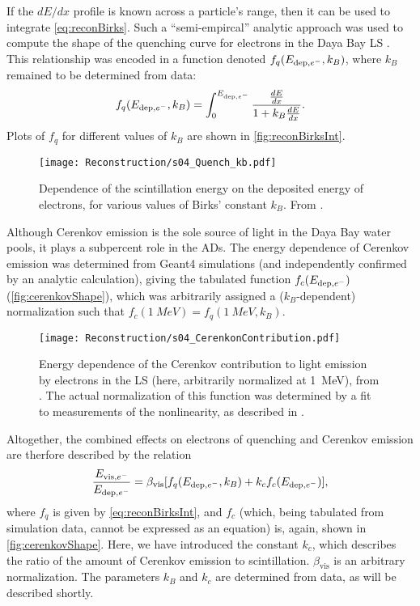 \documentclass[../thesis.tex]{subfiles}
\begin{document}
If the $dE/dx$ profile is known across a particle's range, then it can be used to integrate \eqref{eq:reconBirks}. Such a ``semi-empircal'' analytic approach was used to compute the shape of the quenching curve for electrons in the Daya Bay LS \cite{NonlinearityPaper}. This relationship was encoded in a function denoted $f_q(E_{\mathrm{dep},e^-}, k_B)$, where $k_B$ remained to be determined from data:
\begin{equation}
  f_q(E_{\mathrm{dep},e^-},k_B) = \int_0^{E_{\mathrm{dep},e^-}} \frac{\frac{dE}{dx}}{1 + k_B \frac{dE}{dx}}.
  \label{eq:reconBirksInt}
\end{equation}
Plots of $f_q$ for different values of $k_B$ are shown in \autoref{fig:reconBirksInt}.

\begin{figure}[h]
  \texttt{[image: Reconstruction/s04\_Quench\_kb.pdf]}
  \caption{Dependence of the scintillation energy on the deposited energy of electrons, for various values of Birks' constant $k_B$. From \cite{NonlinearityPaper}.}
  \label{fig:reconBirksInt}
\end{figure}

Although Cerenkov emission is the sole source of light in the Daya Bay water pools, it plays a subpercent role in the ADs. The energy dependence of Cerenkov emission was determined from Geant4 simulations (and independently confirmed by an analytic calculation), giving the tabulated function $f_c(E_{\mathrm{dep},e^-})$ (\autoref{fig:cerenkovShape}), which was arbitrarily assigned a ($k_B$-dependent) normalization such that $f_c(\SI{1}{MeV}) = f_q(\SI{1}{MeV}, k_B)$. 

\begin{figure}[h]
  \texttt{[image: Reconstruction/s04\_CerenkonContribution.pdf]}
  \caption{Energy dependence of the Cerenkov contribution to light emission by electrons in the LS (here, arbitrarily normalized at 1~MeV), from \cite{NonlinearityPaper}. The actual normalization of this function was determined by a fit to measurements of the nonlinearity, as described in \cite{NonlinearityPaper}.}
  \label{fig:cerenkovShape}
\end{figure}

Altogether, the combined effects on electrons of quenching and Cerenkov emission are therfore described by the relation
\begin{equation}
  \label{eq:reconScintNonlin}
  \frac{E_{\mathrm{vis},e^-}}{E_{\mathrm{dep},e^-}} = \beta_{\mathrm{vis}}[f_q(E_{\mathrm{dep},e^-}, k_B) + k_c f_c(E_{\mathrm{dep},e^-})],
\end{equation}
where $f_q$ is given by \autoref{eq:reconBirksInt}, and $f_c$ (which, being tabulated from simulation data, cannot be expressed as an equation) is, again, shown in \autoref{fig:cerenkovShape}. Here, we have introduced the constant $k_c$, which describes the ratio of the amount of Cerenkov emission to scintillation. $\beta_{\mathrm{vis}}$ is an arbitrary normalization. The parameters $k_B$ and $k_c$ are determined from data, as will be described shortly.
\end{document}
